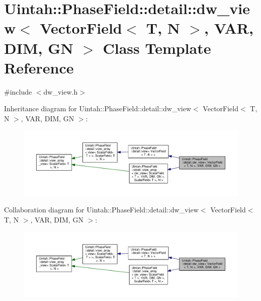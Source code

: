 \hypertarget{classUintah_1_1PhaseField_1_1detail_1_1dw__view_3_01VectorField_3_01T_00_01N_01_4_00_01VAR_00_01DIM_00_01GN_01_4}{}\section{Uintah\+:\+:Phase\+Field\+:\+:detail\+:\+:dw\+\_\+view$<$ Vector\+Field$<$ T, N $>$, V\+AR, D\+IM, GN $>$ Class Template Reference}
\label{classUintah_1_1PhaseField_1_1detail_1_1dw__view_3_01VectorField_3_01T_00_01N_01_4_00_01VAR_00_01DIM_00_01GN_01_4}


{\ttfamily \#include $<$dw\+\_\+view.\+h$>$}



Inheritance diagram for Uintah\+:\+:Phase\+Field\+:\+:detail\+:\+:dw\+\_\+view$<$ Vector\+Field$<$ T, N $>$, V\+AR, D\+IM, GN $>$\+:\nopagebreak
\begin{figure}[H]
\begin{center}
\leavevmode
\includegraphics[width=350pt]{classUintah_1_1PhaseField_1_1detail_1_1dw__view_3_01VectorField_3_01T_00_01N_01_4_00_01VAR_00_01832ca52ecf5087efa55bd89c1d12620e}
\end{center}
\end{figure}


Collaboration diagram for Uintah\+:\+:Phase\+Field\+:\+:detail\+:\+:dw\+\_\+view$<$ Vector\+Field$<$ T, N $>$, V\+AR, D\+IM, GN $>$\+:\nopagebreak
\begin{figure}[H]
\begin{center}
\leavevmode
\includegraphics[width=350pt]{classUintah_1_1PhaseField_1_1detail_1_1dw__view_3_01VectorField_3_01T_00_01N_01_4_00_01VAR_00_01DIM_00_01GN_01_4__coll__graph}
\end{center}
\end{figure}
